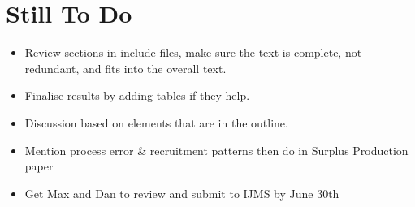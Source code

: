 \documentclass[a4paper]{article}
\begin{document}
\maketitle
 
\section*{Still To Do}
\begin{itemize}
   \item Review sections in include files, make sure the text is complete, not redundant,  and fits into the overall text.
   \item Finalise results by adding tables if they help.
   \item Discussion based on elements that are in the outline.
   \item Mention process error \& recruitment patterns then do in Surplus Production paper  
   \item Get Max and Dan to review and submit to IJMS by June 30th
\end{itemize}
\end{document}
